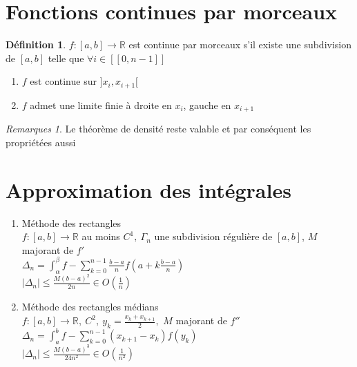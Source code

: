 \documentclass[fleqn]{article}
\theoremstyle{definition} \newtheorem*{defi}{D\'efinition}
\theoremstyle{definition} \newtheorem*{theo}{Th\'eor\`eme}
\theoremstyle{definition} \newtheorem*{coro}{Corollaire}
\theoremstyle{remark} \newtheorem*{rqs}{Remarques}
\theoremstyle{definition} \newtheorem*{prop}{Propri\'et\'e}
\begin{document}
\section{Fonctions continues par morceaux}
\begin{defi}
	$f:[a,b] \rightarrow \mathbb{R}$ est continue par morceaux s'il existe une subdivision de $[a,b]$ telle que $\forall i \in [\![0,n-1]\!]$
	\begin{enumerate}
		\item $f$ est continue sur $]x_i, x_{i+1}[$
		\item $f$ admet une limite finie \`a droite en $x_i$, gauche en $x_{i+1}$
	\end{enumerate}
\end{defi}

\begin{rqs}
	Le th\'eor\`eme de densit\'e reste valable et par cons\'equent les propri\'et\'ees aussi
\end{rqs}

\section{Approximation des int\'egrales}
\begin{enumerate}
	\item M\'ethode des rectangles \\
		$f:[a,b] \rightarrow \mathbb{R}$ au moins $C^1,\ \Gamma_n$ une subdivision r\'eguli\`ere de $[a,b]$, $M$ majorant de $f'$ \\
		$\Delta_n = \int_\alpha^\beta f - \sum_{k=0}^{n-1} \frac{b-a}{n} f(a + k\frac{b-a}{n})$ \\
		$|\Delta_n| \leq \frac{M(b-a)^2}{2n} \in O(\frac{1}{n})$
	\item M\'ethode des rectangles m\'edians \\
		$f:[a,b] \rightarrow \mathbb{R},\ C^2,\ y_k = \frac{x_k + x_{k+1}}{2},$ $M$ majorant de $f''$\\
		$\Delta_n = \int_a^b f - \sum_{k=0}^{n-1} (x_{k+1} - x_k)f(y_k)$ \\
		$|\Delta_n| \leq \frac{M(b-a)^3}{24n^2} \in O(\frac{1}{n^2})$

\end{enumerate}
\end{document}
